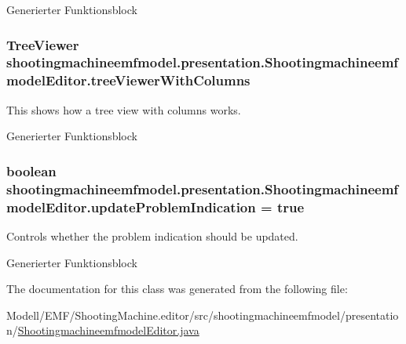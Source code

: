 Generierter Funktionsblock \hypertarget{classshootingmachineemfmodel_1_1presentation_1_1_shootingmachineemfmodel_editor_aeccb5b2ffe5e81b881fcf3a2d8b71407}{
\subsubsection[{tree\-Viewer\-With\-Columns}]{\setlength{\rightskip}{0pt plus 5cm}Tree\-Viewer shootingmachineemfmodel.\-presentation.\-Shootingmachineemfmodel\-Editor.\-tree\-Viewer\-With\-Columns\hspace{0.3cm}{\ttfamily [protected]}}}\label{classshootingmachineemfmodel_1_1presentation_1_1_shootingmachineemfmodel_editor_aeccb5b2ffe5e81b881fcf3a2d8b71407}
This shows how a tree view with columns works.

Generierter Funktionsblock \hypertarget{classshootingmachineemfmodel_1_1presentation_1_1_shootingmachineemfmodel_editor_afd2a0e17f4d9edea40ce610d8ba3a814}{
\subsubsection[{update\-Problem\-Indication}]{\setlength{\rightskip}{0pt plus 5cm}boolean shootingmachineemfmodel.\-presentation.\-Shootingmachineemfmodel\-Editor.\-update\-Problem\-Indication = true\hspace{0.3cm}{\ttfamily [protected]}}}\label{classshootingmachineemfmodel_1_1presentation_1_1_shootingmachineemfmodel_editor_afd2a0e17f4d9edea40ce610d8ba3a814}
Controls whether the problem indication should be updated.

Generierter Funktionsblock 

The documentation for this class was generated from the following file\-:\begin{DoxyCompactItemize}
\item 
Modell/\-E\-M\-F/\-Shooting\-Machine.\-editor/src/shootingmachineemfmodel/presentation/\hyperlink{_shootingmachineemfmodel_editor_8java}{Shootingmachineemfmodel\-Editor.\-java}\end{DoxyCompactItemize}
